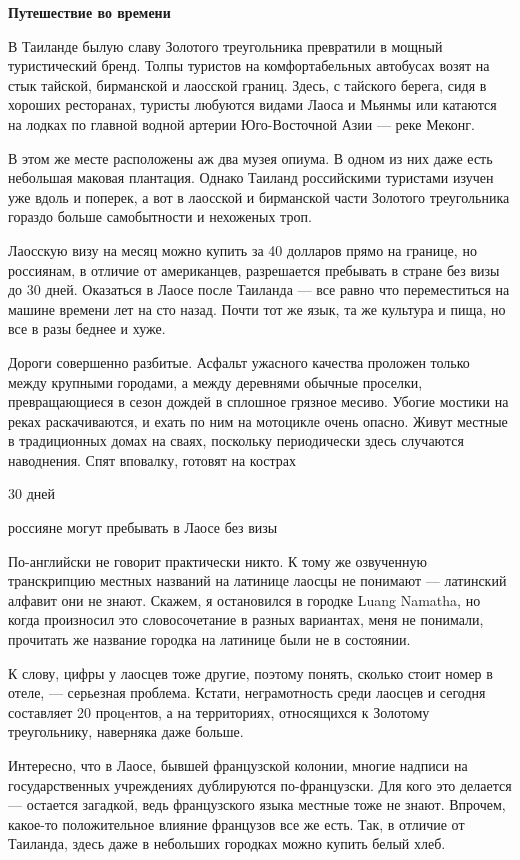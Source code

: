 \textbf{Путешествие во времени}

В Таиланде былую славу Золотого треугольника превратили в мощный туристический бренд. Толпы туристов на комфортабельных автобусах возят на стык тайской, бирманской и лаосской границ. Здесь, с тайского берега, сидя в хороших ресторанах, туристы любуются видами Лаоса и Мьянмы или катаются на лодках по главной водной артерии Юго-Восточной Азии — реке Меконг.

В этом же месте расположены аж два музея опиума. В одном из них даже есть небольшая маковая плантация. Однако Таиланд российскими туристами изучен уже вдоль и поперек, а вот в лаосской и бирманской части Золотого треугольника гораздо больше самобытности и нехоженых троп.

Лаосскую визу на месяц можно купить за 40 долларов прямо на границе, но россиянам, в отличие от американцев, разрешается пребывать в стране без визы до 30 дней. Оказаться в Лаосе после Таиланда — все равно что переместиться на машине времени лет на сто назад. Почти тот же язык, та же культура и пища, но все в разы беднее и хуже.

Дороги совершенно разбитые. Асфальт ужасного качества проложен только между крупными городами, а между деревнями обычные проселки, превращающиеся в сезон дождей в сплошное грязное месиво. Убогие мостики на реках раскачиваются, и ехать по ним на мотоцикле очень опасно. Живут местные в традиционных домах на сваях, поскольку периодически здесь случаются наводнения. Спят вповалку, готовят на кострах

\begin{center}
    {\Huge
        30 дней
    }

    {\Large
        россияне могут пребывать в Лаосе без визы
    }
\end{center}


По-английски не говорит практически никто. К тому же озвученную транскрипцию местных названий на латинице лаосцы не понимают — латинский алфавит они не знают. Скажем, я остановился в городке Luang Namatha, но когда произносил это словосочетание в разных вариантах, меня не понимали, прочитать же название городка на латинице были не в состоянии.

К слову, цифры у лаосцев тоже другие, поэтому понять, сколько стоит номер в отеле, — серьезная проблема. Кстати, неграмотность среди лаосцев и сегодня составляет 20 процeнтов, а на территориях, относящихся к Золотому треугольнику, наверняка даже больше.

Интересно, что в Лаосе, бывшей французской колонии, многие надписи на государственных учреждениях дублируются по-французски. Для кого это делается — остается загадкой, ведь французского языка местные тоже не знают. Впрочем, какое-то положительное влияние французов все же есть. Так, в отличие от Таиланда, здесь даже в небольших городках можно купить белый хлеб.

